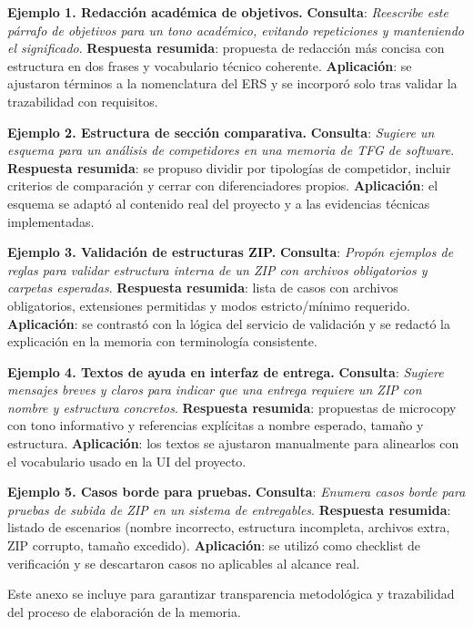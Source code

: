 \textbf{Ejemplo 1. Redacci\'on acad\'emica de objetivos.}
\textbf{Consulta}: \emph{Reescribe este p\'arrafo de objetivos para un tono acad\'emico,
evitando repeticiones y manteniendo el significado}. 
\textbf{Respuesta resumida}: propuesta de redacci\'on m\'as concisa
con estructura en dos frases y vocabulario t\'ecnico coherente.
\textbf{Aplicaci\'on}: se ajustaron t\'erminos a la nomenclatura del ERS
y se incorpor\'o solo tras validar la trazabilidad con requisitos.

\textbf{Ejemplo 2. Estructura de secci\'on comparativa.}
\textbf{Consulta}: \emph{Sugiere un esquema para un an\'alisis de competidores
en una memoria de TFG de software}. 
\textbf{Respuesta resumida}: se propuso dividir por tipolog\'ias de competidor,
incluir criterios de comparaci\'on y cerrar con diferenciadores propios.
\textbf{Aplicaci\'on}: el esquema se adapt\'o al contenido real del proyecto
y a las evidencias t\'ecnicas implementadas.

\textbf{Ejemplo 3. Validaci\'on de estructuras ZIP.}
\textbf{Consulta}: \emph{Prop\'on ejemplos de reglas para validar estructura
interna de un ZIP con archivos obligatorios y carpetas esperadas}. 
\textbf{Respuesta resumida}: lista de casos con archivos obligatorios,
extensiones permitidas y modos estricto/m\'inimo requerido.
\textbf{Aplicaci\'on}: se contrast\'o con la l\'ogica del servicio de validaci\'on
y se redact\'o la explicaci\'on en la memoria con terminolog\'ia consistente.

\textbf{Ejemplo 4. Textos de ayuda en interfaz de entrega.}
\textbf{Consulta}: \emph{Sugiere mensajes breves y claros para indicar
que una entrega requiere un ZIP con nombre y estructura concretos}. 
\textbf{Respuesta resumida}: propuestas de microcopy con tono informativo
y referencias expl\'icitas a nombre esperado, tama\~no y estructura.
\textbf{Aplicaci\'on}: los textos se ajustaron manualmente para alinearlos
con el vocabulario usado en la UI del proyecto.

\textbf{Ejemplo 5. Casos borde para pruebas.}
\textbf{Consulta}: \emph{Enumera casos borde para pruebas de subida de ZIP
en un sistema de entregables}. 
\textbf{Respuesta resumida}: listado de escenarios (nombre incorrecto,
estructura incompleta, archivos extra, ZIP corrupto, tama\~no excedido).
\textbf{Aplicaci\'on}: se utiliz\'o como checklist de verificaci\'on y
se descartaron casos no aplicables al alcance real.

Este anexo se incluye para garantizar transparencia metodol\'ogica
y trazabilidad del proceso de elaboraci\'on de la memoria.

